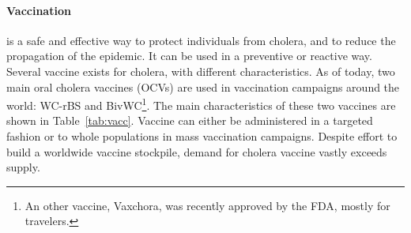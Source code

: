 \paragraph{Vaccination} is a safe and effective way to protect individuals from cholera, and to reduce the propagation of the epidemic. It can be used in a preventive or reactive way. Several vaccine exists for cholera, with different characteristics. As of today, two main oral cholera vaccines (OCVs) are used in vaccination campaigns around the world: WC-rBS and BivWC\footnote{An other vaccine, Vaxchora, was recently approved by the FDA, mostly for travelers.}. The main characteristics of these two vaccines are shown in Table~\ref{tab:vacc}\cite{WHO:CholeraVaccinesWHO:2017,WHO:BackgroundPaperWholeCell:2017,Azman:PopulationLevelEffectCholera:2016,Luquero:FirstOutbreakResponse:2013}. Vaccine can either be administered in a targeted fashion or to whole populations in mass vaccination campaigns. Despite effort to build a worldwide vaccine stockpile, demand for cholera vaccine vastly exceeds supply\cite{Parker:AdaptingGlobalShortage:2017a,Seidlein:PreventingCholeraOutbreaks:2018}.
